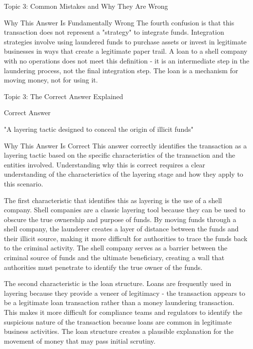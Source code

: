 \documentclass[8pt]{beamer}  %
\newcommand{\correct}{\textcolor{correctgreen}{\ding{51}}}
\begin{document}
\begin{frame}{Topic 3: Common Mistakes and Why They Are Wrong}
\begin{block}{\large Why This Answer Is Fundamentally Wrong}
			The fourth confusion is that this transaction does not represent a "strategy" to integrate funds. Integration strategies involve using laundered funds to purchase assets or invest in legitimate businesses in ways that create a legitimate paper trail. A loan to a shell company with no operations does not meet this definition - it is an intermediate step in the laundering process, not the final integration step. The loan is a mechanism for moving money, not for using it.
		\end{block}
	\end{frame}
	
	\begin{frame}{Topic 3: The Correct Answer Explained}
		\begin{block}{\large \correct \textcolor{correctgreen}{Correct Answer}}
			\begin{center}
				\Large "A layering tactic designed to conceal the origin of illicit funds"
			\end{center}
		\end{block}
		
		\vspace{0.2cm}
		\begin{block}{\large Why This Answer Is Correct}
			This answer correctly identifies the transaction as a layering tactic based on the specific characteristics of the transaction and the entities involved. Understanding why this is correct requires a clear understanding of the characteristics of the layering stage and how they apply to this scenario.
			
			The first characteristic that identifies this as layering is the use of a shell company. Shell companies are a classic layering tool because they can be used to obscure the true ownership and purpose of funds. By moving funds through a shell company, the launderer creates a layer of distance between the funds and their illicit source, making it more difficult for authorities to trace the funds back to the criminal activity. The shell company serves as a barrier between the criminal source of funds and the ultimate beneficiary, creating a wall that authorities must penetrate to identify the true owner of the funds.
			
			The second characteristic is the loan structure. Loans are frequently used in layering because they provide a veneer of legitimacy - the transaction appears to be a legitimate loan transaction rather than a money laundering transaction. This makes it more difficult for compliance teams and regulators to identify the suspicious nature of the transaction because loans are common in legitimate business activities. The loan structure creates a plausible explanation for the movement of money that may pass initial scrutiny.
			

\end{block}
\end{frame}
\end{document}
